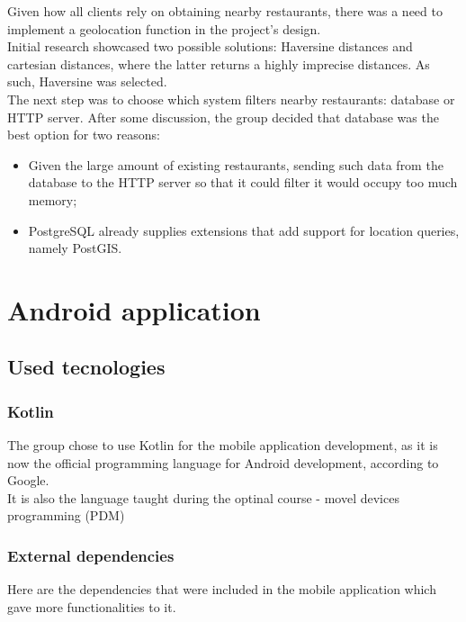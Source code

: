 Given how all clients rely on obtaining nearby restaurants, there was a need to implement a geolocation function in the project's design.\\

Initial research showcased two possible solutions: Haversine distances and cartesian distances, where the latter returns a highly imprecise distances.
As such, Haversine was selected.\\

The next step was to choose which system filters nearby restaurants: database or HTTP server. After some discussion, the group decided that database was the best
option for two reasons: 
\begin{itemize}
    \item Given the large amount of existing restaurants, sending such data from the database to the HTTP server so that it could filter it would occupy too much memory;
    \item PostgreSQL already supplies extensions that add support for location queries, namely PostGIS.
\end{itemize}

\section{Android application}

\subsection{Used tecnologies}

\subsubsection{Kotlin}

The group chose to use Kotlin for the mobile application development, as it is now the official programming language for Android development,
according to Google.\\

It is also the language taught during the optinal course - movel devices programming (PDM)\\

\subsubsection{External dependencies}

Here are the dependencies that were included in the mobile application which gave more functionalities to it.

